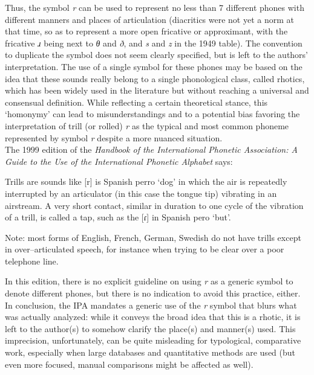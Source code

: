 Thus, the symbol \textit{r} can be used to represent no less than 7 different phones with different manners and places of articulation (diacritics were not yet a norm at that time, so as to represent a  more open fricative or approximant, with the fricative \textit{ɹ} being next to \textit{θ} and \textit{ð}, and \textit{s} and \textit{z} in the 1949 table). The convention to duplicate the symbol does not seem clearly specified, but is left to the authors' interpretation. The use of a single symbol for these phones may be based on the idea that these sounds really belong to a single phonological class, called rhotics, which has been widely used in the literature \parencite{barryAnotherRtickle1997,scobbieVariable2006,magnusonStoryTwoVocal2007,chabotWhatWrongBeing2019} but without reaching a universal and consensual definition. While reflecting a certain theoretical stance, this ‘homonymy’ can lead to misunderstandings and to a potential bias favoring the interpretation of trill (or rolled) \textit{r} as the typical and most common phoneme represented by symbol \textit{r} despite a more nuanced situation.\\

The 1999 edition of the \textit{Handbook of the International Phonetic Association: A Guide to the Use of the International Phonetic Alphabet} \parencite{ipaHandbookInternationalPhonetic1999} says:

\begin{displayquote}
Trills are sounds like [r] is Spanish perro ‘dog’ in which the air is repeatedly interrupted by an articulator (in this case the tongue tip) vibrating in an airstream. A very short contact, similar in duration to one cycle of the vibration of a trill, is called a tap, such as the [ɾ] in Spanish pero ‘but’. \parencite[8]{ipaHandbookInternationalPhonetic1999}
\end{displayquote}
\begin{displayquote}
Note: most forms of English, French, German, Swedish do not have trills except in over–articulated speech, for instance when trying to be clear over a poor telephone line. \parencite[19]{ipaHandbookInternationalPhonetic1999}
\end{displayquote}
In this edition, there is no explicit guideline on using \textit{r} as a generic symbol to denote different phones, but there is no indication to avoid this practice, either.\\

In conclusion, the IPA mandates a generic use of the \textit{r} symbol that blurs what was actually analyzed: while it conveys the broad idea that this is a rhotic, it is left to the author(s) to somehow clarify the place(s) and manner(s) used. This imprecision, unfortunately, can be quite misleading for typological, comparative work, especially when large databases and quantitative methods are used (but even more focused, manual comparisons might be affected as well).

